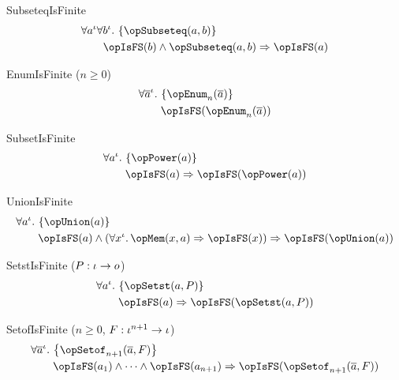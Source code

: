 \documentclass[11pt, a4paper, oneside]{article}
\begin{document}
\begin{axioms}
\item[SubseteqIsFinite] \[
        \begin{aligned}
            &\forall a^\idv \forall b^\idv.\, \st{ \opSubseteq(a, b) } \\
            &\qquad \opIsFS(b) \wedge \opSubseteq(a, b) \imp \opIsFS(a)
        \end{aligned}
    \]

\item[EnumIsFinite ($n \ge 0$)] \[
        \begin{aligned}
            &\forall \overline{a}^\idv.\, \st{ \opEnum_n(\overline{a}) } \\
            &\qquad \opIsFS(\opEnum_n(\overline{a}))
        \end{aligned}
    \]

\item[SubsetIsFinite] \[
        \begin{aligned}
            &\forall a^\idv.\, \st{ \opPower(a) } \\
            &\qquad \opIsFS(a) \imp \opIsFS(\opPower(a))
        \end{aligned}
    \]

\item[UnionIsFinite] \[
        \begin{aligned}
            &\forall a^\idv.\, \st{ \opUnion(a) } \\
            &\qquad \opIsFS(a) \wedge (\forall x^\idv.\, \opMem(x, a) \imp \opIsFS(x)) \imp \opIsFS(\opUnion(a))
        \end{aligned}
    \]

\item[SetstIsFinite ($P : \iota \rightarrow o$)] \[
        \begin{aligned}
            &\forall a^\idv.\, \st{ \opSetst(a, P) } \\
            &\qquad \opIsFS(a) \imp \opIsFS(\opSetst(a, P))
        \end{aligned}
    \]

\item[SetofIsFinite ($n \ge 0$, $F : \iota^{n+1} \rightarrow \iota$)] \[
        \begin{aligned}
            &\forall \overline{a}^\idv.\, \st{ \opSetof_{n+1}(\overline{a}, F) } \\
            &\qquad \opIsFS(a_1) \wedge \cdots \wedge \opIsFS(a_{n+1}) \imp \opIsFS(\opSetof_{n+1}(\overline{a}, F))
        \end{aligned}
    \]


\end{axioms}
\end{document}
